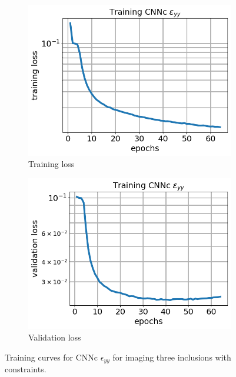 \documentclass[12pt]{article}
\newcommand{\nhgfigheight}{4.0cm}
\begin{document}
\begin{figure}[h]
  \centering
  \begin{subfigure}[b]{0.45\linewidth}
    \includegraphics[totalheight=\nhgfigheight]{Figures/final3c/training/eyy/field_strainyy_plot_loss.png}
    \caption{Training loss}
  \end{subfigure}
  \begin{subfigure}[b]{0.45\linewidth}
    \includegraphics[totalheight=\nhgfigheight]{Figures/final3c/training/eyy/field_strainyy_plot_val_loss.png}
    \caption{Validation loss}
  \end{subfigure}
\caption{\label{fig:threeinctanh:traineyy} Training curves for CNNc $\epsilon_{yy}$ for imaging three inclusions with constraints.}
\end{figure}
\end{document}
